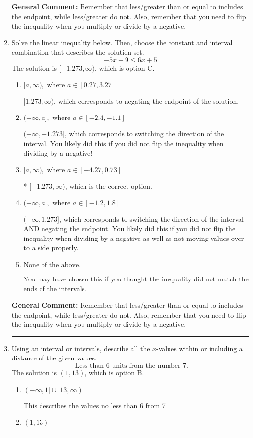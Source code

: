 \documentclass{extbook}[14pt]
\newcommand{\litem}[1]{\item #1

\rule{\textwidth}{0.4pt}}
\begin{document}
\begin{enumerate}
{\textbf{General Comment:} Remember that less/greater than or equal to includes the endpoint, while less/greater do not. Also, remember that you need to flip the inequality when you multiply or divide by a negative.
}
\litem{
Solve the linear inequality below. Then, choose the constant and interval combination that describes the solution set.
\[ -5x -9 \leq 6x + 5 \]The solution is \( [-1.273, \infty) \), which is option C.\begin{enumerate}[label=\Alph*.]
\item \( [a, \infty), \text{ where } a \in [0.27, 3.27] \)

 $[1.273, \infty)$, which corresponds to negating the endpoint of the solution.
\item \( (-\infty, a], \text{ where } a \in [-2.4, -1.1] \)

 $(-\infty, -1.273]$, which corresponds to switching the direction of the interval. You likely did this if you did not flip the inequality when dividing by a negative!
\item \( [a, \infty), \text{ where } a \in [-4.27, 0.73] \)

* $[-1.273, \infty)$, which is the correct option.
\item \( (-\infty, a], \text{ where } a \in [-1.2, 1.8] \)

 $(-\infty, 1.273]$, which corresponds to switching the direction of the interval AND negating the endpoint. You likely did this if you did not flip the inequality when dividing by a negative as well as not moving values over to a side properly.
\item \( \text{None of the above}. \)

You may have chosen this if you thought the inequality did not match the ends of the intervals.
\end{enumerate}

\textbf{General Comment:} Remember that less/greater than or equal to includes the endpoint, while less/greater do not. Also, remember that you need to flip the inequality when you multiply or divide by a negative.
}
\litem{
Using an interval or intervals, describe all the $x$-values within or including a distance of the given values.
\[ \text{ Less than } 6 \text{ units from the number } 7. \]The solution is \( (1, 13) \), which is option B.\begin{enumerate}[label=\Alph*.]
\item \( (-\infty, 1] \cup [13, \infty) \)

This describes the values no less than 6 from 7
\item \( (1, 13) \)


\end{enumerate}}
\end{enumerate}
\end{document}
